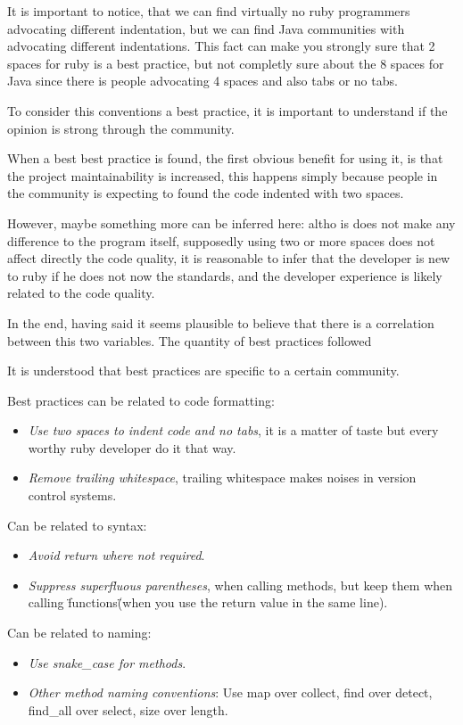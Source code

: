 It is important to notice,
that we can find virtually no ruby programmers advocating different indentation, 
but we can find Java communities with advocating different indentations.
This fact can make you strongly sure that 2 spaces for ruby is a best practice,
but not completly sure about the 8 spaces for Java since there is people advocating 4 spaces and 
also tabs or no tabs.

To consider this conventions a best practice, it is important to understand if the
opinion is strong through the community.

When a best best practice is found, the first obvious benefit for using it,
is that the project maintainability is increased,
this happens simply because people in the community is expecting to found the code indented with two spaces.

However, maybe something more can be inferred here:
altho is does not make any difference to the program itself, 
supposedly using two or more spaces does not affect directly the code quality, 
it is reasonable to infer that the developer is new to ruby if he does not now the standards, 
and the developer experience is likely related to the code quality. 

In the end, having said it seems plausible to believe that there is a correlation between this two variables.
The quantity of best practices followed

It is understood that best practices are specific to a certain community.


Best practices can be related to code formatting:
\begin{itemize}
\item \emph{Use two spaces to indent code and no tabs}, it is a matter of taste but every worthy ruby developer do it that way.
\item \emph{Remove trailing whitespace}, trailing whitespace makes noises in version control systems.
\end{itemize}

Can be related to syntax:
\begin{itemize}
\item \emph{Avoid return where not required}.
\item \emph{Suppress superfluous parentheses}, when calling methods, but keep them when calling \"functions\" 
(when you use the return value in the same line).
\end{itemize}

Can be related to naming:
\begin{itemize}
\item \emph{Use snake\_case for methods}.
\item \emph{Other method naming conventions}: Use map over collect, find over detect, find\_all over select, size over length.
\end{itemize}

